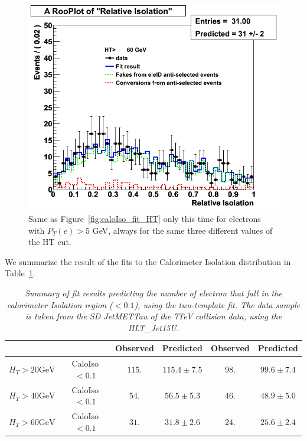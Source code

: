 \begin{figure}[h!]
\includegraphics[scale=0.28]{Plots/caloIso_pt5_ht60.png}
\caption{Same as Figure~\ref{fig:caloIso_fit_HT} only this time for electrons with $P_T(e)>5$ GeV, always for the same three different values of the HT cut.}\label{fig:combIso_fit_HT_5}
\end{figure}

We summarize the result of the fits to the Calorimeter Isolation distribution in Table~\ref{tab:IsoFits}.  

\begin{table}[h!]
\vspace{5mm}
\begin{center}
\begin{tabular}{|c||c||c|c||c|c|}
\hline
& & Observed & Predicted & Observed &  Predicted \\
\hline
\hline
$H_{T}>20 \text{GeV}$ & CaloIso$<0.1$ & $115.$ & $115.4 \pm 7.5$ & $98.$ & $99.6 \pm 7.4$ \\
$H_{T}>40 \text{GeV}$ & CaloIso$<0.1$ & $54.$ & $56.5 \pm 5.3$ & $46.$ & $48.9 \pm 5.0$ \\
$H_{T}>60 \text{GeV}$ & CaloIso$<0.1$ & $31.$ & $31.8 \pm 2.6$ & $24.$ & $25.6 \pm 2.4$ \\
\hline
\end{tabular}
\end{center}
\caption{\textit{Summary of fit results predicting the number of electron that fall in the calorimeter Isolation region ($<0.1$), using the two-template fit. The data sample is taken from the SD JetMETTau of the 7TeV collision data, using the HLT\_Jet15U. }}
\label{tab:IsoFits}
\end{table}
\vspace{5mm}

